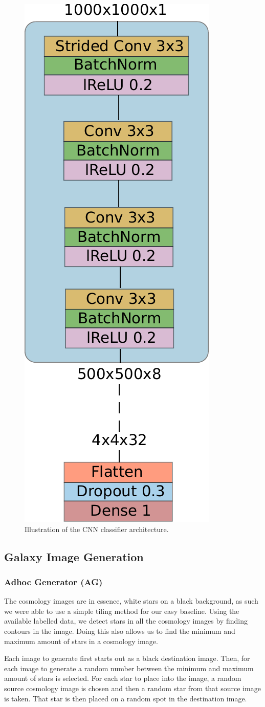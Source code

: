 \documentclass[10pt,conference,compsocconf]{IEEEtran}
\begin{document}
\begin{figure}
    \centering
    \includegraphics[width=0.4\columnwidth]{assets/nn_classifier_arch.pdf}
    \caption{Illustration of the CNN classifier architecture.}
    \label{fig:nn_classifier_arch}
\end{figure}

\subsection{Galaxy Image Generation}
\subsubsection{Adhoc Generator (AG)} %
The cosmology images are in essence, white stars on a black background, as such we were able to use a simple tiling method for our easy baseline. Using the available labelled data, we detect stars in all the cosmology images by finding contours in the image. Doing this also allows us to find the minimum and maximum amount of stars in a cosmology image. 

Each image to generate first starts out as a black destination image. Then, for each image to generate a random number between the minimum and maximum amount of stars is selected. For each star to place into the image, a random source cosmology image is chosen and then a random star from that source image is taken. That star is then placed on a random spot in the destination image.
\end{document}

